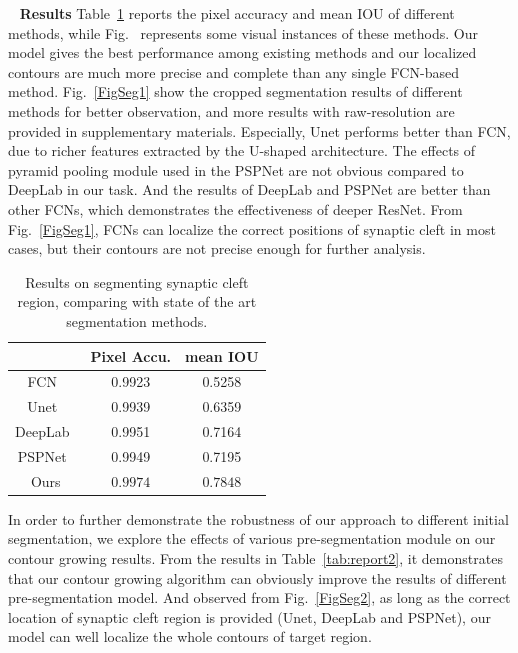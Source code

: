 ~ \noindent\textbf{Results}
Table~\ref{tab:report1} reports the pixel accuracy and mean IOU of different methods, while Fig.~ represents some visual instances of these methods.
Our model gives the best performance among existing methods and our localized contours are much more precise and complete than any single FCN-based method.
Fig.~\ref{FigSeg1} show the cropped segmentation results of different methods for better observation, and more results with raw-resolution are provided in supplementary materials. 
%
Especially, Unet performs better than FCN, due to richer features extracted by the U-shaped architecture.
%
The effects of pyramid pooling module used in the PSPNet are not obvious compared to DeepLab in our task.
And the results of DeepLab and PSPNet are better than other FCNs, which demonstrates the effectiveness of deeper ResNet.
From Fig.~\ref{FigSeg1}, FCNs can localize the correct positions of synaptic cleft in most cases, but their contours are not precise enough for further analysis.

\begin{table}[t]
\begin{center}
\caption{Results on segmenting synaptic cleft region, comparing with state of the art segmentation methods.} \label{tab:report1}
\begin{tabular}{|c|c|c|}
  \hline
   & Pixel Accu. & mean IOU
  \\
  \hline
  FCN~\cite{Long2015} & 0.9923 & 0.5258 \\
  Unet~\cite{Ronneberger2015} &  0.9939 & 0.6359 \\
  DeepLab~\cite{Chen2016a} & 0.9951 & 0.7164 \\
  PSPNet~\cite{Chen2016a} & 0.9949 & 0.7195 \\
  Ours & $\mathbf{0.9974}$ & $\mathbf{0.7848}$ \\
  \hline
\end{tabular}
\end{center}
\end{table}


In order to further demonstrate the robustness of our approach to different initial segmentation, we explore the effects of various pre-segmentation module on our contour growing results.
%
From the results in Table~\ref{tab:report2}, it demonstrates that our contour growing algorithm can obviously improve the results of different pre-segmentation model.
And observed from Fig.~\ref{FigSeg2}, as long as the correct location of synaptic cleft region is provided (Unet, DeepLab and PSPNet), our model can well localize the whole contours of target region.


